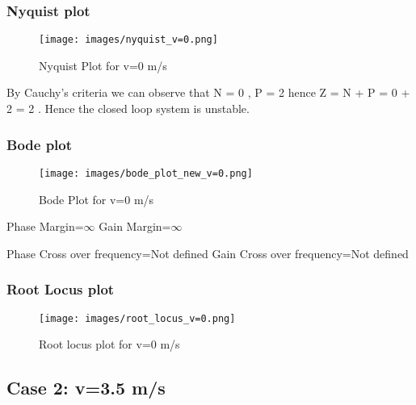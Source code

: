 \documentclass[notitlepage]{article}
\begin{document}
\subsubsection{Nyquist plot}
\begin{figure}[h]
    \centering
    \texttt{[image: images/nyquist\_v=0.png]}
     \caption{Nyquist Plot for v=0 m/s}
     \label{fig:my_label}
 \end{figure}
\small \noindent By Cauchy's criteria we can observe that N = 0 , P = 2 hence Z = N + P = 0 + 2 = 2 . Hence the closed loop system is unstable.
\newpage
\subsubsection{Bode plot}
\begin{figure}[h]
     \centering
     \texttt{[image: images/bode\_plot\_new\_v=0.png]}
      \caption{Bode Plot for v=0 m/s}
      \label{fig:my_label}
  \end{figure} 
Phase Margin=$\infty$  \hspace{33mm} Gain Margin=$\infty$ 

\vspace{1mm}
Phase Cross over frequency=Not defined \hspace{2mm} Gain Cross over frequency=Not defined
\newpage
\subsubsection{Root Locus plot}
\begin{figure}[h]
     \centering
    \texttt{[image: images/root\_locus\_v=0.png]}
     \caption{Root locus plot for v=0 m/s}
     \label{fig:my_label}
 \end{figure}



\newpage
\subsection{Case 2: v=3.5 m/s} 
\end{document}
